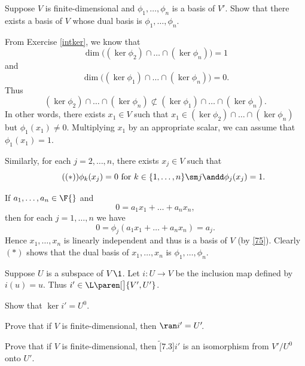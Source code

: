 \exercise
Suppose $V$ is finite-dimensional and $\phi_1, \dots, \phi_n$ is a basis of $V'\!$. Show that there exists a basis of $V$ whose dual basis is $\phi_1, \dots, \phi_n$.

\begin{Solution}
From Exercise \ref{intker}, we know that
\[
\dim \bigl( (\ker \phi_2) \cap \dots \cap (\ker \phi_n)\bigr) = 1
\]
and
\[
\dim \bigl( (\ker \phi_1) \cap \dots \cap (\ker \phi_n)\bigr) = 0.
\]
Thus
\[
(\ker \phi_2) \cap \dots \cap (\ker \phi_n) \nsubset (\ker \phi_1) \cap \dots \cap (\ker \phi_n).
\]
In other words, there exists $x_1 \in V$ such that $x_1 \in (\ker \phi_2) \cap \dots \cap (\ker \phi_n)$ but $\phi_1(x_1) \ne 0$. Multiplying $x_1$ by an appropriate scalar, we can assume that $\phi_1(x_1) = 1$.

Similarly, for each $j = 2, \dots, n$, there exists $x_j \in V$ such that
\[ \tag{$(*)$}
\phi_k(x_j) = 0 \text{\ for\ }
k \in \{1, \dots, n\} \sm j \andd \phi_j(x_j) = 1.
\]

If $a_1, \dots, a_n \in \F{}$ and
\[
0 = a_1 x_1 + \dots + a_n x_n,
\]
then for each $j = 1, \dots, n$ we have
\[
0 = \phi_j(a_1 x_1 + \dots + a_n x_n) = a_j.
\]
Hence $x_1, \dots, x_n$ is linearly independent and thus is a basis of $V$ (by \ref{75}). Clearly $(*)$ shows that the dual basis of $x_1, \dots, x_n$ is $\phi_1, \dots, \phi_n$.
\end{Solution}

\exercise
Suppose $U$ is a subspace of $V\1$. Let $i \colon U \to V$ be the inclusion map defined by $i(u) = u$. Thus
$i' \in \L\paren[\big]{V', U'}$.
\begin{subtheorem}
\item
Show that $\ker i' = U^0\!$.
\item
Prove that if $V$ is finite-dimensional, then $\ran i' = U'\!$.
\item
Prove that if $V$ is finite-dimensional, then $\tilde[7.3]{i'}$ is an isomorphism from $V'/U^0$ onto $U'\!$.
\end{subtheorem}

